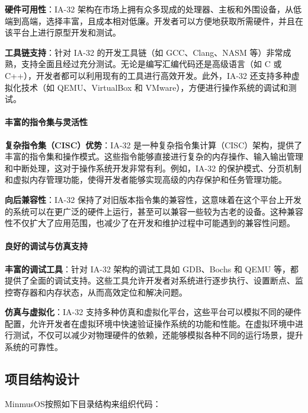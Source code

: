 \textbf{硬件可用性}：IA-32 架构在市场上拥有众多现成的处理器、主板和外围设备，从低端到高端，选择丰富，且成本相对低廉。开发者可以方便地获取所需硬件，并且在该平台上进行原型开发和测试。

\textbf{工具链支持}：针对 IA-32 的开发工具链（如 GCC、Clang、NASM 等）非常成熟，支持全面且经过充分测试。无论是编写汇编代码还是高级语言（如 C 或 C++），开发者都可以利用现有的工具进行高效开发。此外，IA-32 还支持多种虚拟化技术（如 QEMU、VirtualBox 和 VMware），方便进行操作系统的调试和测试。

\paragraph{丰富的指令集与灵活性}

\textbf{复杂指令集（CISC）优势}：IA-32 是一种复杂指令集计算（CISC）架构，提供了丰富的指令集和操作模式。这些指令能够直接进行复杂的内存操作、输入输出管理和中断处理，这对于操作系统开发非常有利。例如，IA-32 的保护模式、分页机制和虚拟内存管理功能，使得开发者能够实现高级的内存保护和任务管理功能。

\textbf{向后兼容性}：IA-32 保持了对旧版本指令集的兼容性，这意味着在这个平台上开发的系统可以在更广泛的硬件上运行，甚至可以兼容一些较为古老的设备。这种兼容性不仅扩大了应用范围，也减少了在开发和维护过程中可能遇到的兼容性问题。

\paragraph{良好的调试与仿真支持}

\textbf{丰富的调试工具}：针对 IA-32 架构的调试工具如 GDB、Bochs 和 QEMU 等，都提供了全面的调试支持。这些工具允许开发者对系统进行逐步执行、设置断点、监控寄存器和内存状态，从而高效定位和解决问题。

\textbf{仿真与虚拟化}：IA-32 支持多种仿真和虚拟化平台，这些平台可以模拟不同的硬件配置，允许开发者在虚拟环境中快速验证操作系统的功能和性能。在虚拟环境中进行测试，不仅可以减少对物理硬件的依赖，还能够模拟各种不同的运行场景，提升系统的可靠性。

\subsection{项目结构设计}

MinmusOS按照如下目录结构来组织代码：

